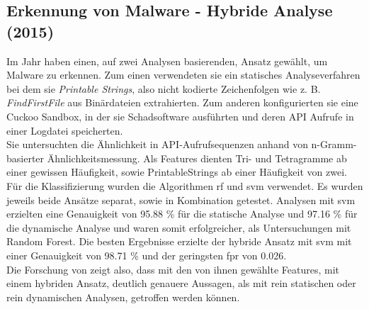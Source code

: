 \documentclass[
    12pt, %
    DIV10,
    ngerman, %
    a4paper, %
    oneside, %
    titlepage, %
    parskip=half, %
    headings=normal, %
    listof=totoc, %
    bibliography=totoc, %
    index=totoc, %
    captions=tableheading, %
    final %
]{scrreprt}
\begin{document}
\subsection{Erkennung von Malware - Hybride Analyse (2015)}
Im Jahr \citeyear{Shijo2015} haben \citeauthor{Shijo2015} einen, auf zwei Analysen basierenden, Ansatz gewählt, um Malware zu erkennen. Zum einen verwendeten sie ein statisches Analyseverfahren bei dem sie \emph{Printable Strings}, also nicht kodierte Zeichenfolgen wie z. B. \emph{FindFirstFile} aus Binärdateien extrahierten. Zum anderen konfigurierten sie eine Cuckoo Sandbox, in der sie Schadsoftware ausführten und deren API Aufrufe in einer Logdatei speicherten.\\
Sie untersuchten die Ähnlichkeit in API-Aufrufsequenzen anhand von n-Gramm-basierter Ähnlichkeitsmessung. 
Als Features dienten Tri- und Tetragramme ab einer gewissen Häufigkeit, sowie PrintableStrings ab einer Häufigkeit von zwei.
Für die Klassifizierung wurden die Algorithmen \ac{rf} und \ac{svm} verwendet.
Es wurden jeweils beide Ansätze separat, sowie in Kombination getestet. Analysen mit \ac{svm} erzielten eine Genauigkeit von 95.88 \% für die statische Analyse und 97.16 \% für die dynamische Analyse und waren somit erfolgreicher, als Untersuchungen mit Random Forest. Die besten Ergebnisse erzielte der hybride Ansatz mit \ac{svm} mit einer Genauigkeit von 98.71 \% und der geringsten \ac{fpr} von 0.026.\\
Die Forschung von \citeauthor{Shijo2015} zeigt also, dass mit den von ihnen gewählte Features, mit einem hybriden Ansatz, deutlich genauere Aussagen, als mit rein statischen oder rein dynamischen Analysen, getroffen werden können.

%
\end{document}
